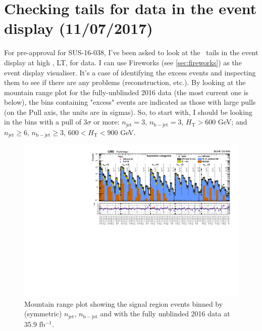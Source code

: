 \newpage
\chapter{Checking \texorpdfstring{\htmiss}{HTmiss} tails for data in the event display (11/07/2017)}

For pre-approval for SUS-16-038, I've been asked to look at the \htmiss\ tails in the event display at high \HT, LT, for data. I can use Fireworks (see \ref{sec:fireworks}) as the event display visualiser. It's a case of identifying the excess events and inspecting them to see if there are any problems (reconstruction, etc.). By looking at the mountain range plot for the fully-unblinded 2016 data (the most current one is below), the bins containing "excess" events are indicated as those with large pulls (on the Pull axis, the units are in sigmas). So, to start with, I should be looking in the bins with a pull of 3$\sigma$ or more: $n_{\mathrm{jet}} = 3$, $n_{\mathrm{b-jet}} = 3$, $H_{\mathrm{T}} > 600$ GeV; and $n_{\mathrm{jet}} \geq 6$, $n_{\mathrm{b-jet}} \geq 3$, $600 < H_{\mathrm{T}} < 900$ GeV.

\begin{figure}[H]
\centering
\includegraphics[width=\textwidth]{./sec27/summaryPlot_Symmetric_prefit_overlay_fit_b.pdf}
\caption{Mountain range plot showing the signal region events binned by (symmetric) $n_{\mathrm{jet}}$, $n_{\mathrm{b-jet}}$ and \HT with the fully unblinded 2016 data at 35.9 fb$^{-1}$. }
\end{figure}

